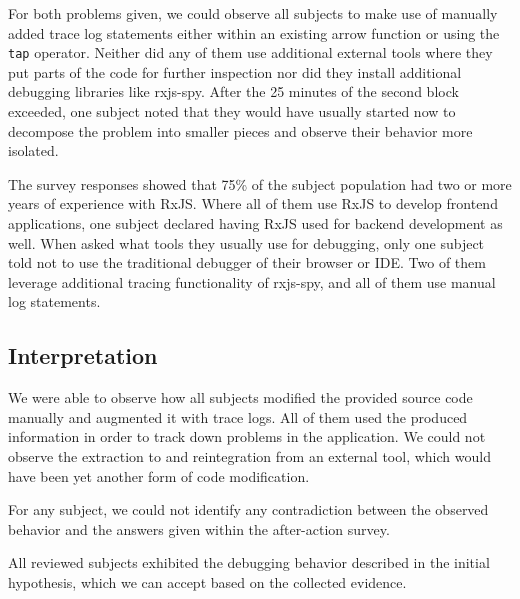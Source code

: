 \documentclass[12pt,a4paper]{article}
\begin{document}
For both problems given, we could observe all subjects to make use of manually added trace log statements either within an existing arrow function or using the \texttt{tap} operator. Neither did any of them use additional external tools where they put parts of the code for further inspection nor did they install additional debugging libraries like rxjs-spy.
After the 25 minutes of the second block exceeded, one subject noted that they would have usually started now to decompose the problem into smaller pieces and observe their behavior more isolated.

The survey responses showed that 75\% of the subject population had two or more years of experience with RxJS. Where all of them use RxJS to develop frontend applications, one subject declared having RxJS used for backend development as well. When asked what tools they usually use for debugging, only one subject told not to use the traditional debugger of their browser or IDE. Two of them leverage additional tracing functionality of rxjs-spy, and all of them use manual log statements.

\subsection{Interpretation}

We were able to observe how all subjects modified the provided source code manually and augmented it with trace logs. All of them used the produced information in order to track down problems in the application. We could not observe the extraction to and reintegration from an external tool, which would have been yet another form of code modification.

For any subject, we could not identify any contradiction between the observed behavior and the answers given within the after-action survey.

All reviewed subjects exhibited the debugging behavior described in the initial hypothesis, which we can accept based on the collected evidence.
\end{document}
